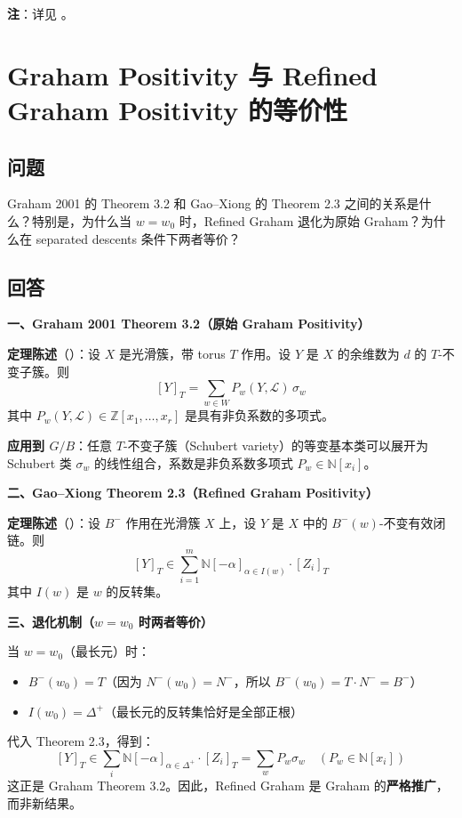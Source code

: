 \textbf{注}：详见 \cite[ Theorem 10.6.4, Chapter 16.5]{anderson2023}。

\section{Graham Positivity 与 Refined Graham Positivity 的等价性}\label{sec:qa-GrahamVsRefinedConnection}
\subsection{问题}
Graham 2001 的 Theorem 3.2 和 Gao--Xiong \cite{GX2025} 的 Theorem 2.3 之间的关系是什么？特别是，为什么当 $w = w_0$ 时，Refined Graham 退化为原始 Graham？为什么在 separated descents 条件下两者等价？

\subsection{回答}

\textbf{一、Graham 2001 Theorem 3.2（原始 Graham Positivity）}

\textbf{定理陈述}（\cite{Gr}）：设 $X$ 是光滑簇，带 torus $T$ 作用。设 $Y$ 是 $X$ 的余维数为 $d$ 的 $T$-不变子簇。则
$$[Y]_T = \sum_{w \in W} P_w(Y,\mathcal{L})\,\sigma_w$$
其中 $P_w(Y,\mathcal{L}) \in \mathbb{Z}[x_1,\ldots,x_r]$ 是具有非负系数的多项式。

\textbf{应用到 $G/B$}：任意 $T$-不变子簇（Schubert variety）的等变基本类可以展开为 Schubert 类 $\sigma_w$ 的线性组合，系数是非负系数多项式 $P_w \in \mathbb{N}[x_i]$。

\textbf{二、Gao--Xiong \cite{GX2025} Theorem 2.3（Refined Graham Positivity）}

\textbf{定理陈述}（\cite[ Theorem 2.3]{GX2025}）：设 $B^-$ 作用在光滑簇 $X$ 上，设 $Y$ 是 $X$ 中的 $B^-(w)$-不变有效闭链。则
$$[Y]_T \in \sum_{i=1}^m \mathbb{N}[-\alpha]_{\alpha \in I(w)} \cdot [Z_i]_T$$
其中 $I(w)$ 是 $w$ 的反转集。

\textbf{三、退化机制（$w = w_0$ 时两者等价）}

当 $w = w_0$（最长元）时：
\begin{itemize}
\item $B^-(w_0) = T$（因为 $N^-(w_0) = N^-$，所以 $B^-(w_0) = T \cdot N^- = B^-$）
\item $I(w_0) = \Delta^+$（最长元的反转集恰好是全部正根）
\end{itemize}

代入 Theorem 2.3，得到：
$$[Y]_T \in \sum_i \mathbb{N}[-\alpha]_{\alpha \in \Delta^+} \cdot [Z_i]_T = \sum_w P_w \sigma_w \quad (P_w \in \mathbb{N}[x_i])$$
这正是 Graham Theorem 3.2。因此，Refined Graham 是 Graham 的\textbf{严格推广}，而非新结果。

